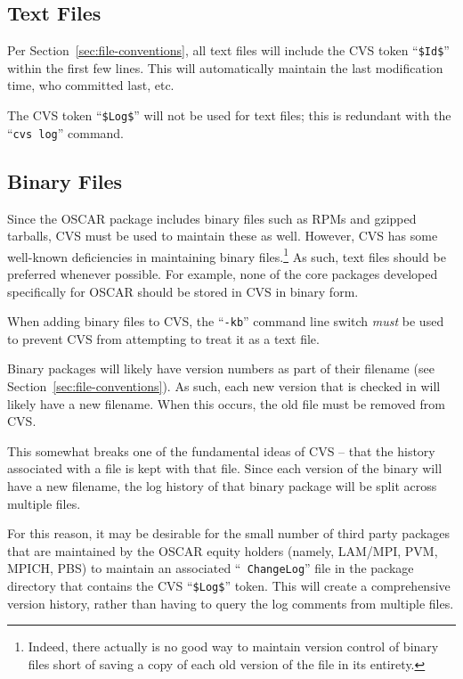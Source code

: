
\subsection{Text Files}

Per Section~\ref{sec:file-conventions}, all text files will include
the CVS token ``{\tt \$Id\$}'' within the first few lines.  This will
automatically maintain the last modification time, who committed last,
etc.  

The CVS token ``{\tt \$Log\$}'' will not be used for text files; this
is redundant with the ``{\tt cvs log}'' command.


\subsection{Binary Files}

Since the OSCAR package includes binary files such as RPMs and gzipped
tarballs, CVS must be used to maintain these as well.  However, CVS
has some well-known deficiencies in maintaining binary
files.\footnote{Indeed, there actually is no good way to maintain
version control of binary files short of saving a copy of each old
version of the file in its entirety.}  As such, text files should be
preferred whenever possible.  For example, none of the core packages
developed specifically for OSCAR should be stored in CVS in binary
form.

When adding binary files to CVS, the ``{\tt -kb}'' command line switch
{\em must} be used to prevent CVS from attempting to treat it as a
text file.

Binary packages will likely have version numbers as part of their
filename (see Section~\ref{sec:file-conventions}).  As such, each new
version that is checked in will likely have a new filename.  When this
occurs, the old file must be removed from CVS.  

This somewhat breaks one of the fundamental ideas of CVS -- that the
history associated with a file is kept with that file.  Since each
version of the binary will have a new filename, the log history of
that binary package will be split across multiple files.  

\begin{discuss}
  For this reason, it may be desirable for the small number of third
  party packages that are maintained by the OSCAR equity holders
  (namely, LAM/MPI, PVM, MPICH, PBS) to maintain an associated ``{\tt
    ChangeLog}'' file in the package directory that contains the CVS
  ``{\tt \$Log\$}'' token.  This will create a comprehensive version
  history, rather than having to query the log comments from multiple
  files.
\end{discuss}

